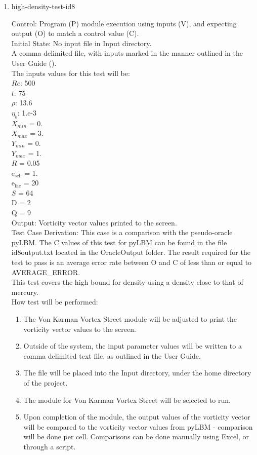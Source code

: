 \documentclass[12pt, titlepage]{article}
\begin{document}
\begin{enumerate}
\item{high-density-test-id8\\}

Control: Program (P) module execution using inputs (V), and expecting output (O) to match a control value (C).\\
					
Initial State: No input file in Input directory.\\
					
A comma delimited file, with inputs marked in the manner outlined in the User Guide (\citet{LBM_UserGuide_PM}).\\The inputs values for this test will be:\\
$Re$: 500\\
$t$: 75\\
$\rho$: 13.6\\
$\eta_b$: 1.e-3\\
$X_{min}$ = 0.\\
$X_{max}$ = 3.\\
$Y_{min}$ = 0.\\
$Y_{max}$ = 1.\\
$R$ = 0.05\\
$\mathrm{e_{sch}}$ = 1.\\
$\mathrm{e_{fac}}$ = 20\\
$S$ = 64\\
$\mathrm{D}$ = 2\\
$\mathrm{Q}$ = 9\\

Output: Vorticity vector values printed to the screen. \\

Test Case Derivation: This case is a comparison with the pseudo-oracle pyLBM. The C values of this test for pyLBM can be found in the file id8output.txt located in the OracleOutput folder. The result required for the test to pass is an average error rate between O and C of less than or equal to AVERAGE\_ERROR.\\
This test covers the high bound for density using a density close to that of mercury.\\

					
How test will be performed: 

\begin{enumerate}
\item The Von Karman Vortex Street module will be adjusted to print the vorticity vector values to the screen.
\item Outside of the system, the input parameter values will be written to a comma delimited text file, as outlined in the User Guide.
\item The file will be placed into the Input directory, under the home directory of the project.
\item The module for Von Karman Vortex Street will be selected to run.
\item Upon completion of the module, the output values of the vorticity vector will be compared to the vorticity vector values from pyLBM - comparison will be done per cell. Comparisons can be done manually using Excel, or through a script.\\
\end{enumerate}


\end{enumerate}
\end{document}
